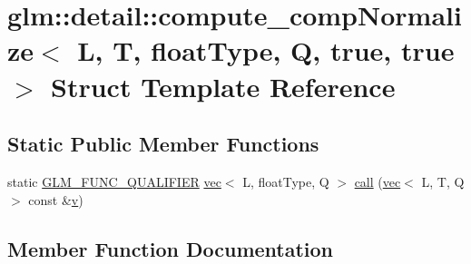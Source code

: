 \hypertarget{structglm_1_1detail_1_1compute__comp_normalize_3_01_l_00_01_t_00_01float_type_00_01_q_00_01true_00_01true_01_4}{}\section{glm\+:\+:detail\+:\+:compute\+\_\+comp\+Normalize$<$ L, T, float\+Type, Q, true, true $>$ Struct Template Reference}
\label{structglm_1_1detail_1_1compute__comp_normalize_3_01_l_00_01_t_00_01float_type_00_01_q_00_01true_00_01true_01_4}
\subsection*{Static Public Member Functions}
\begin{DoxyCompactItemize}
\item 
static \hyperlink{setup_8hpp_a33fdea6f91c5f834105f7415e2a64407}{G\+L\+M\+\_\+\+F\+U\+N\+C\+\_\+\+Q\+U\+A\+L\+I\+F\+I\+ER} \hyperlink{structglm_1_1vec}{vec}$<$ L, float\+Type, Q $>$ \hyperlink{structglm_1_1detail_1_1compute__comp_normalize_3_01_l_00_01_t_00_01float_type_00_01_q_00_01true_00_01true_01_4_aca1253c5ce571f9aa75a98377f2f38cc}{call} (\hyperlink{structglm_1_1vec}{vec}$<$ L, T, Q $>$ const \&\hyperlink{_s_d_l__opengl_8h_a10a82eabcb59d2fcd74acee063775f90}{v})
\end{DoxyCompactItemize}


\subsection{Member Function Documentation}
\mbox{\label{structglm_1_1detail_1_1compute__comp_normalize_3_01_l_00_01_t_00_01float_type_00_01_q_00_01true_00_01true_01_4_aca1253c5ce571f9aa75a98377f2f38cc}} 

